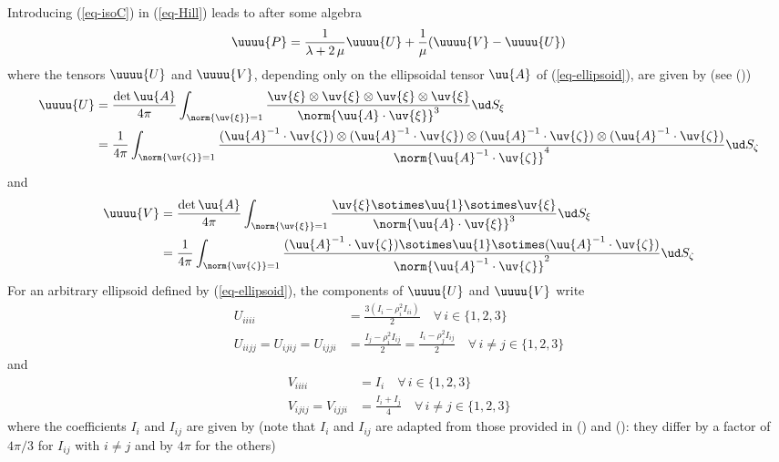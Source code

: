 \documentclass[
  letterpaper,
  DIV=11,
  numbers=noendperiod]{scrreprt}
\begin{document}
Introducing (\ref{eq-isoC}) in (\ref{eq-Hill}) leads to after some
algebra \[
\uuuu{P}=
\frac{1}{\lambda+2\,\mu}
\uuuu{U}
+\frac{1}{\mu}(\uuuu{V}-\uuuu{U})
\] where the tensors \(\uuuu{U}\) and \(\uuuu{V}\), depending only on
the ellipsoidal tensor \(\uu{A}\) of (\ref{eq-ellipsoid}), are given by
(see ())
\[\begin{aligned}
\uuuu{U} &= \frac{\det{\uu{A}}}{4\pi}
\int_{\norm{\uv{\xi}}=1}
\frac{\uv{\xi}\otimes\uv{\xi}\otimes\uv{\xi}\otimes\uv{\xi}}
{\norm{\uu{A}\cdot\uv{\xi}}^3}\ud S_{\xi}\\
&=
\frac{1}{4\pi}
\int_{\norm{\uv{\zeta}}=1}
\frac{%
(\uu{A}^{-1}\cdot\uv{\zeta})
\otimes
(\uu{A}^{-1}\cdot\uv{\zeta})
\otimes
(\uu{A}^{-1}\cdot\uv{\zeta})
\otimes
(\uu{A}^{-1}\cdot\uv{\zeta})
}{\norm{\uu{A}^{-1}\cdot\uv{\zeta}}^4}
\ud S_{\zeta}
\end{aligned}\] and \[\begin{aligned}
\uuuu{V} &= \frac{\det{\uu{A}}}{4\pi}
\int_{\norm{\uv{\xi}}=1}
\frac{\uv{\xi}\sotimes\uu{1}\sotimes\uv{\xi}}
{\norm{\uu{A}\cdot\uv{\xi}}^3}\ud S_{\xi}\\
&=
\frac{1}{4\pi}
\int_{\norm{\uv{\zeta}}=1}
\frac{%
(\uu{A}^{-1}\cdot\uv{\zeta})
\sotimes
\uu{1}
\sotimes
(\uu{A}^{-1}\cdot\uv{\zeta})
}{\norm{\uu{A}^{-1}\cdot\uv{\zeta}}^2}
\ud S_{\zeta}
\end{aligned}\] For an arbitrary ellipsoid defined by
(\ref{eq-ellipsoid}), the components of \(\uuuu{U}\) and \(\uuuu{V}\)
write \[\begin{aligned}
U_{iiii}&=\frac{3(I_i-\rho_i^2I_{ii})}{2} 
\quad\forall\, i\in\{1,2,3\}\\
U_{iijj}=U_{ijij}=U_{ijji}&=\frac{I_j-\rho_i^2I_{ij}}{2} 
=\frac{I_i-\rho_j^2I_{ij}}{2}
\quad\forall\, i\neq j\in\{1,2,3\}
\end{aligned}\] and \[\begin{aligned}
V_{iiii}&=I_i\quad\forall\, i\in\{1,2,3\}\\
V_{ijij}=V_{ijji}&=\frac{I_i+I_j}{4}
\quad\forall\, i\neq j\in\{1,2,3\}
\end{aligned}\] where the coefficients \(I_i\) and \(I_{ij}\) are given
by (note that \(I_i\) and \(I_{ij}\) are adapted from those provided in
() and
(): they differ by a factor of
\(4\pi/3\) for \(I_{ij}\) with \(i\neq j\) and by \(4\pi\) for the
others)
\end{document}
